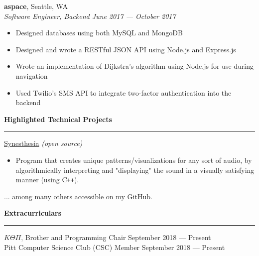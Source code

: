 \documentclass[11pt]{article}
\begin{document}
\begin{flushleft}
		\textbf{aspace}, Seattle, WA\\
		\textit{\small Software Engineer, Backend \hfill June 2017 --- October 2017}
		\vspace{-1.25mm}
		\begin{itemize}
			\item Designed databases using both MySQL and MongoDB
			\vspace{-1.5mm}
			\item Designed and wrote a RESTful JSON API using Node.js and Express.js
			\vspace{-1.5mm}
			\item Wrote an implementation of Dijkstra's algorithm using Node.js for use during navigation
			\vspace{-1.5mm}
			\item Used Twilio's SMS API to integrate two-factor authentication into the backend
		\end{itemize}
		
		\vspace{1.35mm}
		{\large \raggedright \textbf{Highlighted Technical Projects}}
		\vspace{1.25mm}
	
		\hrule
	
		\vspace{2.25mm}
		\href{https://github.com/avigloz/synesthesia}{Synesthesia} \textit{(open source)}
		\vspace{-1.25mm}
		\begin{itemize}
			\item Program that creates unique patterns/visualizations for any sort of audio, by algorithmically interpreting and "displaying" the sound in a visually satisfying manner (using C\texttt{++}).
		\end{itemize}

		... among many others accessible on my GitHub.

		\vspace{1.35mm}
		{\large \raggedright \textbf{Extracurriculars}}
		\vspace{1.25mm}
	
		\hrule
	
		\vspace{2.25mm}
		$K\Theta\Pi$, Brother and Programming Chair \hfill September 2018 --- Present\\
		Pitt Computer Science Club (CSC) Member \hfill September 2018 --- Present
	\end{flushleft}
\end{document}
